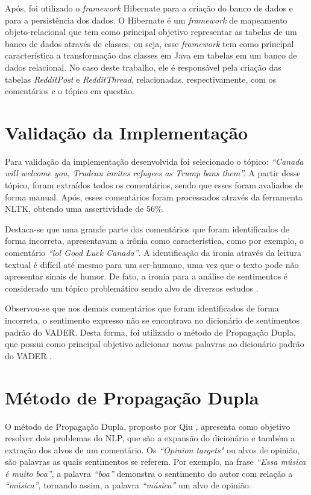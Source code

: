 Após, foi utilizado o \textit{framework} Hibernate
\cite{Iverson:2004:HJD:1044870} para a criação do banco de dados e para a
persistência dos dados. O Hibernate é um \textit{framework} de
mapeamento objeto-relacional que tem como principal objetivo 
representar as tabelas de um banco de dados através de classes, ou seja, esse \textit{framework} tem como principal
característica a transformação das classes em Java em tabelas em um banco de
dados relacional.
No caso deste trabalho, ele é responsável pela criação das tabelas \textit{RedditPost} e
\textit{RedditThread}, relacionadas, respectivamente, com os comentários e o
tópico em questão. 

\section{Validação da Implementação}

Para validação da implementação desenvolvida foi selecionado o tópico:
\textit{``Canada will welcome you, Trudeau invites refugees as Trump bans
them''.}
A partir desse tópico, foram extraídos todos os comentários, sendo que
esses foram avaliados de forma manual. Após, esses comentários foram processados
através da ferramenta \ac{NLTK}, obtendo uma assertividade de 56\%.

Destaca-se que uma grande parte dos comentários que foram identificados de forma
incorreta, apresentavam a irônia como característica, como por exemplo, o
comentário \textit{``lol Good Luck Canada''}. A identificação da ironia através
da leitura textual é difícil até mesmo para um ser-humano, uma vez que o
texto pode não apresentar sinais de humor. De fato, a ironia para a análise de
sentimentos é considerado um tópico problemático sendo alvo de diversos estudos \cite{DBLP:conf/lrec/StranisciBFP16}.

Observou-se que nos demais comentários que foram identificados de forma
incorreta, o sentimento expresso não se encontrava no dicionário de
sentimentos padrão do \ac{VADER}. Desta forma, foi
utilizado o método de Propagação Dupla, que possui como principal objetivo
adicionar novas palavras ao dicionário
padrão do \ac{VADER} \cite{Qiu:2011:OWE:1970420.1970422}.

\section{Método de Propagação Dupla}

O método de Propagação Dupla, proposto por Qiu
\cite{Qiu:2011:OWE:1970420.1970422}, apresenta como objetivo resolver dois
problemas do \ac{NLP}, que são a expansão do dicionário e também a extração dos
alvos de um comentário. Os \textit{``Opinion targets"} ou alvos de opinião, são
palavras as quais sentimentos se referem. Por exemplo, na frase \textit{``Essa
música é muito boa''}, a palavra \textit{``boa''} demonstra o sentimento do
autor com relação a \textit{``música''}, tornando assim, a palavra
\textit{``música''} um alvo de opinião.

